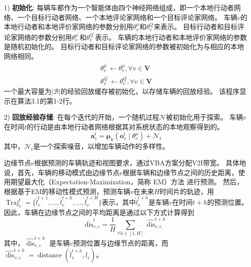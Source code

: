 1) \textbf{初始化}: 每辆车都作为一个智能体由四个神经网络组成，即一个本地行动者网络、一个目标行动者网络、一个本地评论家网络和一个目标评论家网络。
车辆$v$的本地行动者和本地评价家网络的参数分别用$\theta_{v}^{\mu}$和$\theta_{v}^{Q}$来表示。
目标行动者和目标评论家网络的参数分别用$\theta_{v}^{\mu^{\prime}}$和$\theta_{v}^{Q^{\prime}}$表示。
车辆的本地行动者和本地评价家网络的参数是随机初始化的。
目标行动者和目标评论家网络的参数被初始化为与相应的本地网络相同。
\begin{align}
	\theta_{v}^{\mu^{\prime}} \leftarrow \theta_{v}^{\mu}, \forall v \in \mathbf{V}\\
	\theta_{v}^{Q^{\prime}} \leftarrow \theta_{v}^{Q}, \forall v \in \mathbf{V}
\end{align}
一个最大容量为$|\mathcal{B}|$的经验回放缓存被初始化，以存储车辆的回放经验。
该程序显示在算法3.1的第1-2行。

2) \textbf{回放经验存储}:
在每个迭代的开始，一个随机过程$\mathcal{N}$被初始化用于探索。
车辆$v$在时间$t$的行动是由本地行动者网络根据其对系统状态的本地观察得到的。
\begin{equation}
	\boldsymbol{a}_{v}^{t}=\boldsymbol{\mu}_{\boldsymbol{v}}\left(\boldsymbol{o}_{v}^{t} \mid \theta_{v}^{\mu}\right)+\mathcal{N}_{t}
\end{equation}
\noindent 其中，$\mathcal{N}_{t}$是一个探索噪音，以增加车辆动作的多样性。

边缘节点$e$根据预测的车辆轨迹和视图要求，通过VBA方案分配V2I带宽。
具体地说，首先，车辆的移动模式由边缘节点$e$根据车辆和边缘节点之间的历史距离，使用期望最大化（Expectation-Maximization，简称 EM）方法\cite{hofmann2001unsupervised} 进行预测。
然后，根据基于EM的移动性模式预测，预测车辆$v$在未来$H$时间片的轨迹，用$\operatorname{Traj}_{v}^{t} = \{ \hat{l}_{v}^{t+1}, \dots, \hat{l}_{v}^{t+h}, \dots, \hat{l}_{v}^{t+H}\}$表示，其中$\hat{l}_{v}^{t+h}$是车辆$v$在时间$t+h$的预测位置。
因此，车辆在边缘节点之间的平均距离是通过以下方式计算得到
\begin{equation}
	\operatorname{\bar{dis}}_{v, e}^{t} = \frac{1}{H} {\sum_{\forall h \in [1, H]} \widehat{\operatorname{dis}}_{v, e}^{t+h}}
\end{equation}
其中，$\widehat{\operatorname{dis}}_{v, e}^{t+h}$ 是车辆$v$预测位置与边缘节点的距离，而$\widehat{\operatorname{dis}}_{v, e}^{t+h}=\operatorname{distance}(\hat{l}_{v}^{t+h}, l_{e})$。


